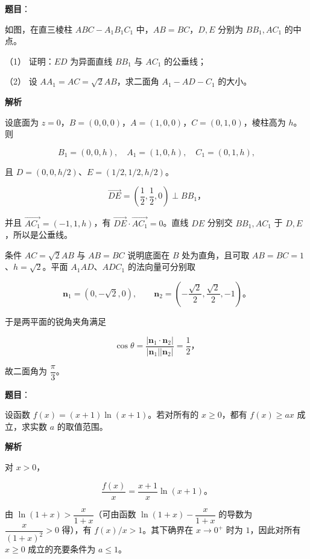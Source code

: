 \begin{answer}

\textbf{题目}：

如图，在直三棱柱 $ABC-A_1B_1C_1$ 中，$AB=BC$，$D,E$ 分别为 $BB_1,AC_1$ 的中点。
\nopagebreak[4]
\begin{center}\end{center}
\nopagebreak[4]
（1） 证明：$ED$ 为异面直线 $BB_1$ 与 $AC_1$ 的公垂线；

（2） 设 $AA_1=AC=\sqrt2AB$，求二面角 $A_1-AD-C_1$ 的大小。

\textbf{解析}

设底面为 $z=0$，$B=(0,0,0)$，$A=(1,0,0)$，$C=(0,1,0)$，棱柱高为 $h$。则

\nopagebreak[4]
\[
B_1=(0,0,h),\quad A_1=(1,0,h),\quad C_1=(0,1,h),
\]

且 $D=(0,0,h/2)$、$E=(1/2,1/2,h/2)$。


\nopagebreak[4]
\[
\overrightarrow{DE}=\left(\frac12,\frac12,0\right)\perp BB_1\text{，}
\]

并且 $\overrightarrow{AC_1}=(-1,1,h)$，有 $\overrightarrow{DE}\cdot\overrightarrow{AC_1}=0$。直线 $DE$ 分别交 $BB_1,AC_1$ 于 $D,E$，所以是公垂线。


条件 $AC=\sqrt2AB$ 与 $AB=BC$ 说明底面在 $B$ 处为直角，且可取 $AB=BC=1$、$h=\sqrt2$。平面 $A_1AD$、$ADC_1$ 的法向量可分别取

\nopagebreak[4]
\[
\boldsymbol n_1=(0,-\sqrt2,0),\qquad
\boldsymbol n_2=\left(-\frac{\sqrt2}{2},\frac{\sqrt2}{2},-1\right)\text{。}
\]

于是两平面的锐角夹角满足

\nopagebreak[4]
\[
\cos\theta=\frac{|\boldsymbol n_1\cdot\boldsymbol n_2|}{|\boldsymbol n_1||\boldsymbol n_2|}=\frac12\text{，}
\]

故二面角为 $\dfrac\pi3$。



\end{answer}
\begin{answer}

\textbf{题目}：

设函数 $f(x)=(x+1)\ln(x+1)$。若对所有的 $x\geqslant0$，都有 $f(x)\geqslant ax$ 成立，求实数 $a$ 的取值范围。

\textbf{解析}

对 $x>0$，

\nopagebreak[4]
\[
\frac{f(x)}x=\frac{x+1}{x}\ln(x+1)\text{。}
\]

由 $\ln(1+x)>\dfrac{x}{1+x}$（可由函数 $\ln(1+x)-\dfrac{x}{1+x}$ 的导数为 $\dfrac{x}{(1+x)^2}>0$ 得），有 $f(x)/x>1$。其下确界在 $x\to0^+$ 时为 $1$，因此对所有 $x\geqslant0$ 成立的充要条件为 $a\leqslant1$。


\end{answer}
